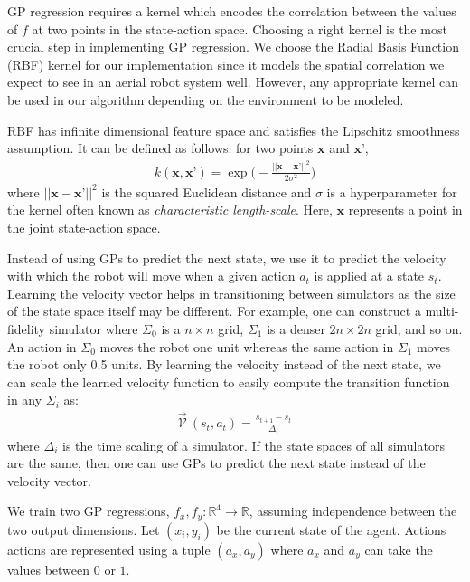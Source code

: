 \documentclass[12pt]{report}
\begin{document}
GP regression requires a kernel which encodes the correlation between the values of $f$ at two points in the state-action space. Choosing a right kernel is the most crucial step in implementing GP regression. We choose the Radial Basis Function (RBF) kernel for our implementation since it models the spatial correlation we expect to see in an aerial robot system well. However, any appropriate kernel can be used in our algorithm depending on the environment to be modeled. 

RBF has infinite dimensional feature space and satisfies the Lipschitz smoothness assumption. It can be defined as follows: for two points $\textbf{x}$ and $\textbf{x'}$,
\begin{equation} \label{kernel_def}
\begin{split}
k(\textbf{x}, \textbf{x'})= \exp\bigg(-\frac{|| \textbf{x}-\textbf{x'}||^2}{2\sigma^2}\bigg)\end{split}
\end{equation}
where $||\textbf{x}-\textbf{x'}||^{2}$ is the squared Euclidean distance and $\sigma$ is a hyperparameter for the kernel often known as \textit{characteristic length-scale}. Here, $\textbf{x}$ represents a point in the joint state-action space.

Instead of using GPs to predict the next state, we use it to predict the velocity with which the robot will move when a given action $a_t$ is applied at a state $s_t$. Learning the velocity vector helps in transitioning between simulators as the size of the state space itself may be different. For example, one can construct a multi-fidelity simulator where $\Sigma_0$ is a $n\times n$ grid, $\Sigma_1$ is a denser $2n\times 2n$ grid, and so on. An action in $\Sigma_0$ moves the robot one unit whereas the same action in $\Sigma_1$ moves the robot only 0.5 units. By learning the velocity instead of the next state, we can scale the learned velocity function to easily compute the transition function in any $\Sigma_i$ as:
\begin{equation} \label{velocity_def}
\begin{split}
\vec{\mathcal{V}} \ (s_t,a_t) = \frac{s_{t+1}-s_t}{\Delta_i} 
\end{split}
\end{equation}
where $\Delta_i$ is the time scaling of a simulator. If the state spaces of all simulators are the same, then one can use GPs to predict the next state instead of the velocity vector.

We train two GP regressions, $f_x,f_y:\mathbb{R}^4\rightarrow\mathbb{R}$, assuming independence between the two output dimensions. Let $(x_i,y_i)$ be the current state of the agent. Actions actions are represented using a tuple $(a_x,a_y)$ where $a_x$ and $a_y$ can take the values between $0$ or $1$. 
\end{document}
